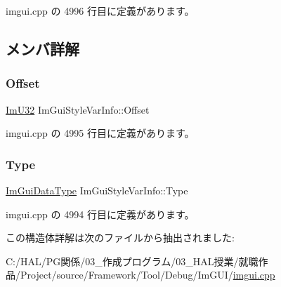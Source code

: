  imgui.\+cpp の 4996 行目に定義があります。



\subsection{メンバ詳解}
\mbox{\label{struct_im_gui_style_var_info_ae900d6a02166d3d0433c18b95aec10e8}} 
\subsubsection{\texorpdfstring{Offset}{Offset}}
{\footnotesize\ttfamily \mbox{\hyperlink{imgui_8h_a118cff4eeb8d00e7d07ce3d6460eed36}{Im\+U32}} Im\+Gui\+Style\+Var\+Info\+::\+Offset}



 imgui.\+cpp の 4995 行目に定義があります。

\mbox{\label{struct_im_gui_style_var_info_a62f42d2bb7b71b7530493e16e622cb81}} 
\subsubsection{\texorpdfstring{Type}{Type}}
{\footnotesize\ttfamily \mbox{\hyperlink{imgui__internal_8h_a22f27475affc8d8a1f2407887e5e1d19}{Im\+Gui\+Data\+Type}} Im\+Gui\+Style\+Var\+Info\+::\+Type}



 imgui.\+cpp の 4994 行目に定義があります。



この構造体詳解は次のファイルから抽出されました\+:\begin{DoxyCompactItemize}
\item 
C\+:/\+H\+A\+L/\+P\+G関係/03\+\_\+作成プログラム/03\+\_\+\+H\+A\+L授業/就職作品/\+Project/source/\+Framework/\+Tool/\+Debug/\+Im\+G\+U\+I/\mbox{\hyperlink{imgui_8cpp}{imgui.\+cpp}}\end{DoxyCompactItemize}
